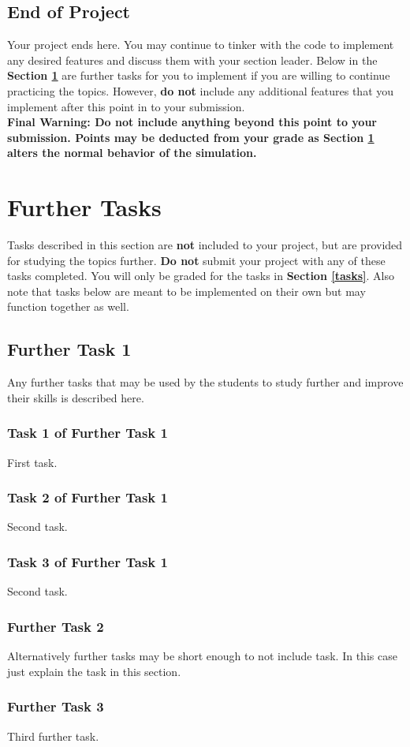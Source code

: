 \documentclass[a4paper]{article}
\begin{document}
	\subsection{End of Project}
	Your project ends here. You may continue to tinker with the code to implement any desired features and discuss them with your section leader. Below in the \textbf{Section \ref{further}} are further tasks for you to implement if you are willing to continue practicing the topics. However, \textbf{do not} include any additional features that you implement after this point in to your submission.  
	\\
	
	\noindent \textbf{Final Warning: Do not include anything beyond this point to your submission. Points may be deducted from your grade as Section \ref{further} alters the normal behavior of the simulation.} 
	
	\section{Further Tasks}
	\label{further}
	Tasks described in this section are \textbf{not} included to your project, but are provided for studying the topics further. \textbf{Do not} submit your project with any of these tasks completed. You will only be graded for the tasks in \textbf{Section \ref{tasks}}. Also note that tasks below are meant to be implemented on their own but may function together as well.
	
	\subsection{Further Task 1}
	Any further tasks that may be used by the students to study further and improve their skills is described here.
	
	\subsubsection{Task 1 of Further Task 1}
	First task.
	
	\subsubsection{Task 2 of Further Task 1}
	Second task.
	
	\subsubsection{Task 3 of Further Task 1}
	Second task.
	
	\subsubsection{Further Task 2}
	Alternatively further tasks may be short enough to not include task. In this case just explain the task in this section.
	
	\subsubsection{Further Task 3}
	Third further task.
	
\end{document}
